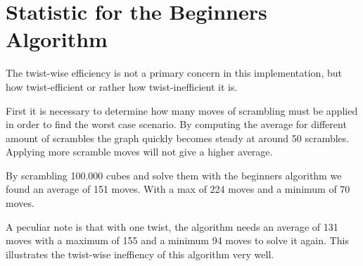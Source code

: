 \section{Statistic for the Beginners Algorithm}
\label{sec:beginnersStat}
The twist-wise efficiency is not a primary concern in this implementation, but how twist-efficient or rather how twist-inefficient it is. 

First it is necessary to determine how many moves of scrambling must be applied in order to find the worst case scenario. By computing the average for different amount of scrambles the graph quickly becomes steady at around 50 scrambles. Applying more scramble moves will not give a higher average. 

By scrambling 100.000 cubes and solve them with the beginners algorithm we found an average of 151 moves. With a max of 224 moves and a minimum of 70 moves. 

A peculiar note is that with one twist, the algorithm needs an average of 131 moves with a maximum of 155 and a minimum 94 moves to solve it again.
This illustrates the twist-wise ineffiency of this algorithm very well.